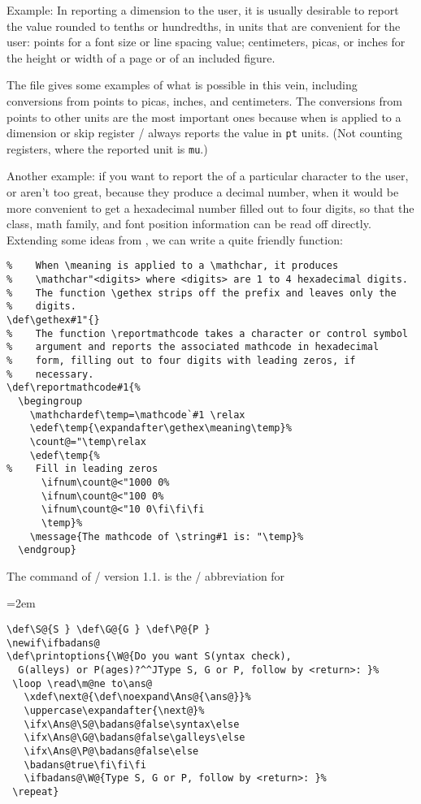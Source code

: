 {Example: In reporting a dimension to the user, it is usually
desirable to report the value rounded to tenths or hundredths, in
units that are convenient for the user: points for a font size or
line spacing value; centimeters, picas, or inches for the height or
width of a page or of an included figure.

The file  gives some examples of what is possible in
this vein, including conversions from points to picas, inches, and
centimeters. The conversions from points to other units are the most
important ones because when  is applied to a dimension or
skip register \tex/ always reports the value in \verb;pt; units. (Not
counting  registers, where the reported unit is \verb;mu;.)

\reqspace{1.5in}


Another example: if you want to report the  of a
particular character to the user,  or
 aren't too great, because they produce a
decimal number, when it would be more
convenient to get a hexadecimal number filled out to four digits, so
that the class, math family, and font position information can be
read off directly.
Extending some ideas from  \cite{testfont}, we can
write a quite friendly  function:
\begin{verbatim}
%    When \meaning is applied to a \mathchar, it produces
%    \mathchar"<digits> where <digits> are 1 to 4 hexadecimal digits.
%    The function \gethex strips off the prefix and leaves only the
%    digits.
\def\gethex#1"{}
%    The function \reportmathcode takes a character or control symbol
%    argument and reports the associated mathcode in hexadecimal
%    form, filling out to four digits with leading zeros, if
%    necessary.
\def\reportmathcode#1{%
  \begingroup
    \mathchardef\temp=\mathcode`#1 \relax
    \edef\temp{\expandafter\gethex\meaning\temp}%
    \count@="\temp\relax
    \edef\temp{%
%    Fill in leading zeros
      \ifnum\count@<"1000 0%
      \ifnum\count@<"100 0%
      \ifnum\count@<"10 0\fi\fi\fi
      \temp}%
    \message{The mathcode of \string#1 is: "\temp}%
  \endgroup}
\end{verbatim}

\begin{example}
\begin{examplebox}%
\caption[]{The  command of \amstex/ version 1.1.
 is the \amstex/ abbreviation for
}\label{amstex/syntax}%
\hfuzz=2em
\begin{verbatim}
\def\S@{S } \def\G@{G } \def\P@{P }
\newif\ifbadans@
\def\printoptions{\W@{Do you want S(yntax check),
  G(alleys) or P(ages)?^^JType S, G or P, follow by <return>: }%
 \loop \read\m@ne to\ans@
   \xdef\next@{\def\noexpand\Ans@{\ans@}}%
   \uppercase\expandafter{\next@}%
   \ifx\Ans@\S@\badans@false\syntax\else
   \ifx\Ans@\G@\badans@false\galleys\else
   \ifx\Ans@\P@\badans@false\else
   \badans@true\fi\fi\fi
   \ifbadans@\W@{Type S, G or P, follow by <return>: }%
 \repeat}
\end{verbatim}


\end{examplebox}
\end{example}}
